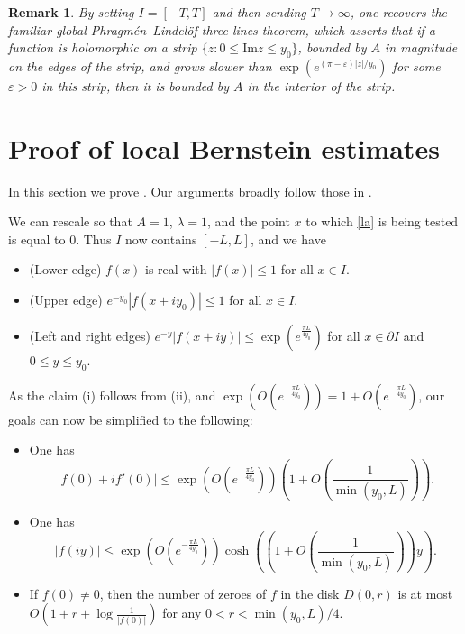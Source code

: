 \documentclass[12pt]{amsart}
\newtheorem{remark}[theorem]{Remark}
\newcommand{\eps}{\varepsilon}
\begin{document}
\begin{remark} By setting $I = [-T,T]$ and then sending $T \to \infty$, one recovers the familiar global Phragm\'en--Lindel\"of three-lines theorem, which asserts that if a function is holomorphic on a strip $\{ z: 0 \leq \mathrm{Im} z \leq y_0\}$, bounded by $A$ in magnitude on the edges of the strip, and grows slower than $\exp( e^{(\pi-\eps) |z|/y_0})$ for some $\eps>0$ in this strip, then it is bounded by $A$ in the interior of the strip.
\end{remark}

\section{Proof of local Bernstein estimates}\label{boas-sec}

In this section we prove . Our arguments broadly follow those in \cite{duffin}.

We can rescale so that $A=1$, $\lambda=1$, and the point $x$ to which \eqref{la} is being tested is equal to $0$.  Thus $I$ now contains $[-L,L]$, and we have
\begin{itemize}
\item (Lower edge) $f(x)$ is real with $|f(x)| \leq 1$ for all $x \in I$.
\item (Upper edge) $e^{-y_0} |f(x+iy_0)| \leq 1$ for all $x \in I$.
\item (Left and right edges) $e^{-y} |f(x+iy)| \leq \exp (e^{\frac{\pi L}{4y_0}})$ for all $x \in \partial I$ and $0 \leq y \leq y_0$.
\end{itemize}
As the claim (i) follows from (ii), and $\exp(O( e^{-\frac{\pi L}{4y_0}} )) = 1 + O( e^{-\frac{\pi L}{4y_0}})$, our goals can now be simplified to the following:

\begin{itemize}
    \item[(ii)]  One has
$$
 |f(0) + i f'(0)| \leq \exp\left(O( e^{-\frac{\pi L}{4y_0}} )\right) \left(1 + O\left(\frac{1}{\min(y_0,L)}\right)\right).
$$
    \item[(iii)]  One has
$$
 |f(iy)| \leq \exp\left(O( e^{-\frac{\pi L}{4y_0}} )\right) \cosh \left( \left(1 + O\left(\frac{1}{\min(y_0,L)}\right) \right) y \right).
$$
    \item[(iv)] If $f(0) \neq 0$, then the number of zeroes of $f$ in the disk $D(0,r)$ is at most $O( 1 + r + \log \frac{1}{|f(0)|})$ for any $0 < r < \min(y_0,L)/4$.
\end{itemize}
\end{document}
